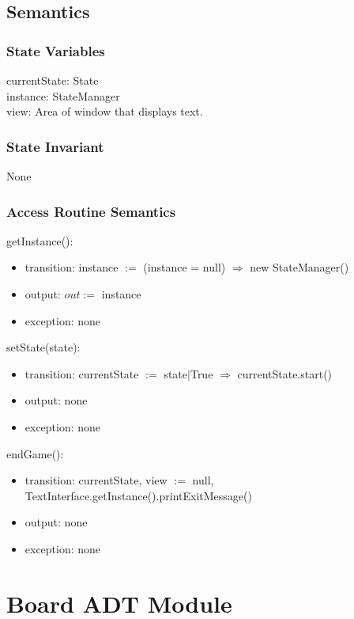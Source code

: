 \documentclass[12pt]{article}
\begin{document}
\subsection* {Semantics}

\subsubsection* {State Variables}

currentState: State\\
instance: StateManager\\
view: Area of window that displays text.\\

\subsubsection* {State Invariant}

None

\subsubsection* {Access Routine Semantics}

\noindent getInstance():
\begin{itemize}
\item transition: instance $:=$ (instance = null) $\Rightarrow$ new StateManager()
\item output: $out :=$ instance
\item exception: none
\end{itemize}

\noindent setState(state):
\begin{itemize}
\item transition: currentState $:=$ state$|$True $\Rightarrow$ currentState.start()
\item output: none
\item exception: none
\end{itemize}

\noindent endGame():
\begin{itemize}
\item transition: currentState, view $:=$ null, TextInterface.getInstance().printExitMessage()
\item output: none
\item exception: none
\end{itemize}

\newpage

\section* {Board ADT Module}
\end{document}
